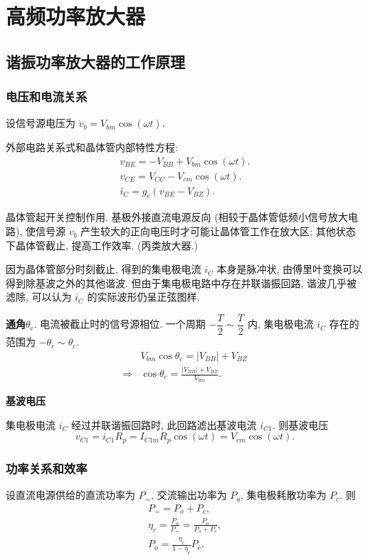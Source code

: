 \section{高频功率放大器} \label{高频功率放大器}
\subsection{谐振功率放大器的工作原理} \label{5 谐振功率放大器的工作原理}
\subsubsection{电压和电流关系}
设信号源电压为 $\dot{v}_b=V_{bm}\cos(\omega t)$.

外部电路关系式和晶体管内部特性方程:
\begin{gather}
    v_{BE}=-V_{BB}+V_{bm}\cos(\omega t). \label{eq:5.1 v BE} \\
    v_{CE}=V_{CC}-V_{cm}\cos(\omega t). \label{eq:5.1 v CE} \\
    i_C=g_c(v_{BE}-V_{BZ}).
\end{gather}

晶体管起开关控制作用. 基极外接直流电源反向 (相较于晶体管低频小信号放大电路), 使信号源 $\dot{v}_b$ 产生较大的正向电压时才可能让晶体管工作在放大区; 其他状态下晶体管截止, 提高工作效率. (丙类放大器.)

因为晶体管部分时刻截止, 得到的集电极电流 $i_C$ 本身是脉冲状, 由傅里叶变换可以得到除基波之外的其他谐波. 但由于集电极电路中存在并联谐振回路, 谐波几乎被滤除, 可以认为 $i_C$ 的实际波形仍呈正弦图样.

\textbf{通角}\quad $\theta_c$. 电流被截止时的信号源相位. 一个周期 $-\dfrac{T}{2}\sim\dfrac{T}{2}$ 内, 集电极电流 $i_C$ 存在的范围为 $-\theta_c\sim\theta_c$.
\begin{align}
    \nonumber   & V_{bm}\cos\theta_c=|V_{BB}|+V_{BZ}                                      \\
    \Rightarrow & \cos\theta_c=\frac{|V_{BB}|+V_{BZ}}{V_{bm}}. \label{eq:5.1 cos theta c}
\end{align}

\textbf{基波电压}

集电极电流 $i_C$ 经过并联谐振回路时, 此回路滤出基波电流 $i_{C1}$. 则基波电压
\begin{equation}
    v_{C1}=i_{C1}R_p=I_{C1m}R_p\cos(\omega t)=V_{cm}\cos(\omega t).
\end{equation}

\subsubsection{功率关系和效率}
设直流电源供给的直流功率为 $P_=$, 交流输出功率为 $P_o$, 集电极耗散功率为 $P_c$. 则
\begin{gather}
    P_==P_o+P_c, \\
    \eta_c=\frac{P_o}{P_=}=\frac{P_o}{P_o+P_c}, \\
    P_o=\frac{\eta_c}{1-\eta_c}P_c.
\end{gather}

